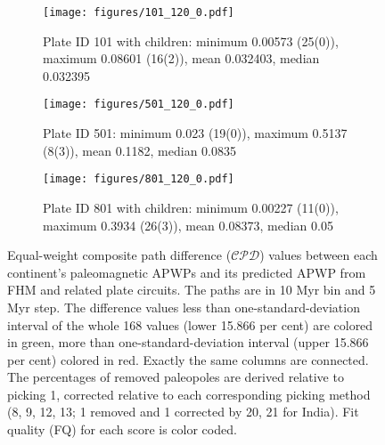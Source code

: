 \begin{figure*}
	\centering
	\begin{subfigure}{.94\textwidth}
		\texttt{[image: figures/101\_120\_0.pdf]}
		\caption{Plate ID 101 with children: minimum 0.00573 (25(0)), maximum
		0.08601 (16(2)), mean 0.032403, median 0.032395}\label{fig-na-dif} %
	\end{subfigure}
	\vspace{.1em} %
	\begin{subfigure}{.94\textwidth}
		\texttt{[image: figures/501\_120\_0.pdf]}
		\caption{Plate ID 501: minimum 0.023 (19(0)), maximum 0.5137 (8(3)),
		mean 0.1182, median 0.0835}\label{fig-in-dif} %
	\end{subfigure}
	\vspace{.1em}
	\begin{subfigure}{.94\textwidth}
		\texttt{[image: figures/801\_120\_0.pdf]}
		\caption{Plate ID 801 with children: minimum 0.00227 (11(0)), maximum
		0.3934 (26(3)), mean 0.08373, median 0.05}\label{fig-au-dif} %
	\end{subfigure}
	\caption[Differences of each plate's paleomagnetic APWPs versus
its FHM predicted APWP]{Equal-weight composite path difference ($\mathcal{CPD}$)
values between each continent's paleomagnetic APWPs and its predicted APWP from
FHM and related plate circuits. The paths are in 10 Myr bin and 5 Myr step. The
difference values less than one-standard-deviation interval of the whole 168
values (lower 15.866 per cent) are colored in green, more than
one-standard-deviation interval (upper 15.866 per cent) colored in red. Exactly
the same columns are connected. The percentages of removed paleopoles are
derived relative to picking 1, corrected relative to each corresponding picking
method (8, 9, 12, 13; 1 removed and 1 corrected by 20, 21 for India). Fit
quality (FQ) for each score is color coded.}\label{fig-dif} %
\end{figure*}

